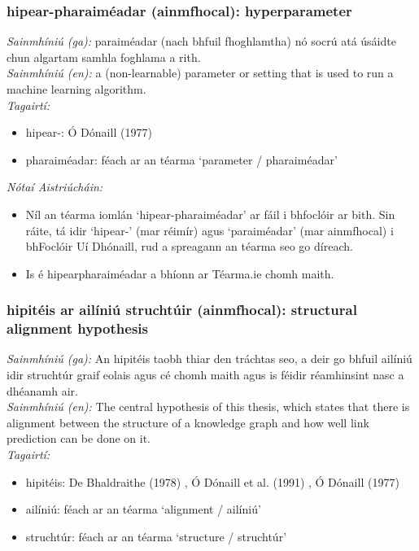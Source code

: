 \subsubsection*{hipear-pharaiméadar (ainmfhocal): hyperparameter}
 \noindent \textit{Sainmhíniú (ga):} paraiméadar (nach bhfuil fhoghlamtha) nó socrú atá úsáidte chun algartam samhla foghlama a rith.
\\
 \noindent \textit{Sainmhíniú (en):} a (non-learnable) parameter or setting that is used to run a machine learning algorithm.
\\
 \noindent \textit{Tagairtí:}
\begin{itemize}
	\item hipear-: Ó Dónaill (1977) \cite{odonaill}
	\item pharaiméadar: féach ar an téarma `parameter / pharaiméadar'
\end{itemize}

 \noindent \textit{Nótaí Aistriúcháin:}
\begin{itemize}
	\item Níl an téarma iomlán `hipear-pharaiméadar' ar fáil i bhfoclóir ar bith. Sin ráite, tá idir `hipear-' (mar réimír) agus `paraiméadar' (mar ainmfhocal) i bhFoclóir Uí Dhónaill, rud a spreagann an téarma seo go díreach.
	\item Is é hipearpharaiméadar a bhíonn ar Téarma.ie chomh maith.
\end{itemize}


\subsubsection*{hipitéis ar ailíniú struchtúir (ainmfhocal): structural alignment hypothesis}
 \noindent \textit{Sainmhíniú (ga):} An hipitéis taobh thiar den tráchtas seo, a deir go bhfuil ailíniú idir struchtúr graif eolais agus cé chomh maith agus is féidir réamhinsint nasc a dhéanamh air.
\\
 \noindent \textit{Sainmhíniú (en):} The central hypothesis of this thesis, which states that there is alignment between the structure of a knowledge graph and how well link prediction can be done on it.
\\
 \noindent \textit{Tagairtí:}
\begin{itemize}
	\item hipitéis: De Bhaldraithe (1978) \cite{de-bhaldraithe}, Ó Dónaill et al. (1991) \cite{focloir-beag}, Ó Dónaill (1977) \cite{odonaill}
	\item ailíniú: féach ar an téarma `alignment / ailíniú'
	\item struchtúr: féach ar an téarma `structure / struchtúr'
\end{itemize}

